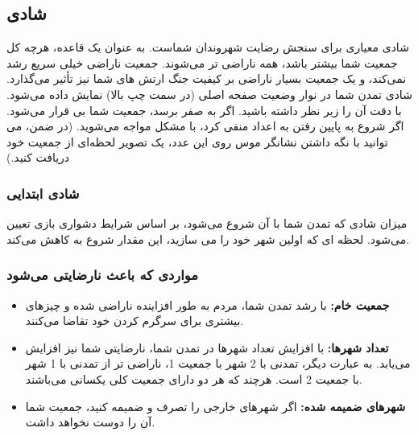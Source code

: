 \documentclass[]{article}
\begin{document}
\subsection*{{\titr شادی}}
شادی معیاری برای سنجش رضایت شهروندان شماست. به عنوان یک قاعده، هرچه کل جمعیت شما بیشتر باشد، همه ناراضی تر می‌شوند. جمعیت ناراضی خیلی سریع رشد نمی‌کند، و یک جمعیت بسیار ناراضی بر کیفیت جنگ ارتش های شما نیز تأثیر می‌گذارد. شادی تمدن شما در نوار وضعیت صفحه اصلی (در سمت چپ بالا) نمایش داده می‌شود. با دقت آن را زیر نظر داشته باشید. اگر به صفر برسد، جمعیت شما بی قرار می‌شود. اگر شروع به پایین رفتن به اعداد منفی کرد، با مشکل مواجه می‌شوید. (در ضمن، می توانید با نگه داشتن نشانگر موس روی این عدد، یک تصویر لحظه‌ای از جمعیت خود دریافت کنید.)

\subsubsection*{{\titr شادی ابتدایی}}
میزان شادی که تمدن شما با آن شروع می‌شود، بر اساس شرایط دشواری بازی تعیین می‌شود. لحظه ای که اولین شهر خود را می سازید، این مقدار شروع به کاهش می‌کند.
\subsubsection*{{\titr مواردی که باعث نارضایتی می‌شود}}
\begin{itemize}
	\item \textbf{جمعیت خام:} با رشد تمدن شما، مردم به طور افزاینده ناراضی شده  و چیزهای بیشتری برای سرگرم کردن خود تقاضا می‌کنند.
	\item \textbf{تعداد شهرها:} با افزایش تعداد شهرها در تمدن شما، نارضایتی شما نیز افزایش می‌یابد. به عبارت دیگر، تمدنی با 2 شهر با جمعیت 1، ناراضی تر از تمدنی با 1 شهر با جمعیت 2 است. هرچند که هر دو دارای جمعیت کلی یکسانی می‌باشند.
	\item \textbf{شهرهای ضمیمه شده:} اگر شهرهای خارجی را تصرف و ضمیمه کنید، جمعیت شما آن را دوست نخواهد داشت.
\end{itemize}
\end{document}
